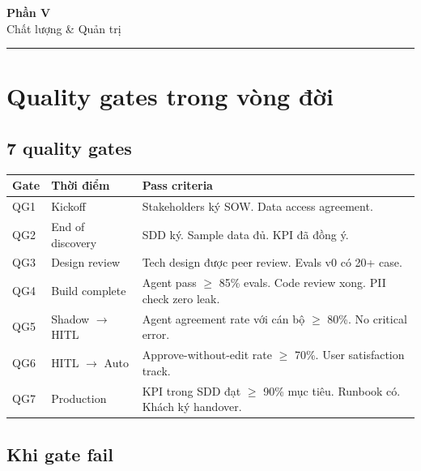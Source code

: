 \documentclass[11pt,a4paper]{article}
\begin{document}
\clearpage

\begin{center}
\vspace*{0.5em}
{\sffamily\bfseries\Huge\color{ink} Phần V}\\[0.5em]
{\sffamily\LARGE\color{mid} Chất lượng \& Quản trị}\\[0.5em]
{\color{mid}\rule{6cm}{0.4pt}}
\end{center}
\vspace{1em}

\section{Quality gates trong vòng đời}

\subsection{7 quality gates}

\begin{tabularx}{\linewidth}{@{}p{1.2cm} p{3cm} X@{}}
\toprule
\textbf{Gate} & \textbf{Thời điểm} & \textbf{Pass criteria} \\
\midrule
QG1 & Kickoff & Stakeholders ký SOW. Data access agreement. \\
QG2 & End of discovery & SDD ký. Sample data đủ. KPI đã đồng ý. \\
QG3 & Design review & Tech design được peer review. Evals v0 có 20+ case. \\
QG4 & Build complete & Agent pass $\geq$ 85\% evals. Code review xong. PII check zero leak. \\
QG5 & Shadow $\to$ HITL & Agent agreement rate với cán bộ $\geq$ 80\%. No critical error. \\
QG6 & HITL $\to$ Auto & Approve-without-edit rate $\geq$ 70\%. User satisfaction track. \\
QG7 & Production & KPI trong SDD đạt $\geq$ 90\% mục tiêu. Runbook có. Khách ký handover. \\
\bottomrule
\end{tabularx}

\subsection{Khi gate fail}
\end{document}
